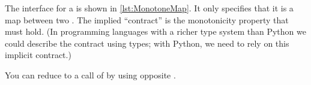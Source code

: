 
The interface for a  is shown in \cref{lst:MonotoneMap}.
It only specifies that it is a map between two .
The implied ``contract'' is the monotonicity property that must hold.
(In programming languages with a richer type system than Python we could describe the contract using types; with Python, we need to rely on this implicit contract.)


\begin{widepar}
\end{widepar}

\begin{hint}
    You can reduce  to a call of  by using opposite .
\end{hint}
